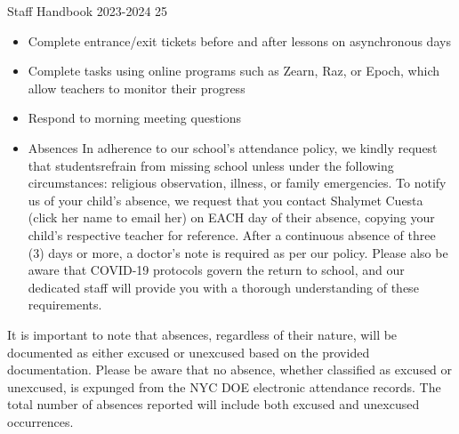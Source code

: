\documentclass[11pt]{article}
\begin{document}
Staff Handbook 2023-2024 25
\begin{itemize}
\item Complete entrance/exit tickets before and after lessons on asynchronous days
\item Complete tasks using online programs such as Zearn, Raz, or Epoch, which allow teachers to monitor their progress
\item Respond to morning meeting questions
\item Absences In adherence to our school’s attendance policy, we kindly request that studentsrefrain from missing school unless under the following circumstances: religious observation, illness, or family emergencies. To notify us of your child’s absence, we request that you contact Shalymet Cuesta (click her name to email her) on EACH day of their absence, copying your child’s respective teacher for reference. After a continuous absence of three (3) days or more, a doctor’s note is required as per our policy. Please also be aware that COVID-19 protocols govern the return to school, and our dedicated staff will provide you with a thorough understanding of these requirements.
\end{itemize}

It is important to note that absences, regardless of their nature, will be documented as either excused or unexcused based on the provided documentation. Please be aware that no absence, whether classified as excused or unexcused, is expunged from the NYC DOE electronic attendance records. The total number of absences reported will include both excused and unexcused occurrences.
\end{document}
